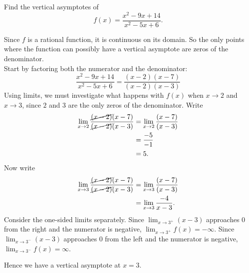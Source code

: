 \documentclass{ximera}
\begin{document}
\begin{example}
Find the vertical asymptotes of 
\[
f(x) = \frac{x^2-9x+14}{x^2-5x+6}.
\]

\begin{explanation}
Since $f$ is a rational function, it is continuous on its domain. So the only points where the function can possibly have a vertical asymptote are zeros of the denominator. \\
Start by factoring both the numerator and the denominator:
\[
\frac{x^2-9x+14}{x^2-5x+6} = \frac{(x-2)(x-7)}{(x-2)(x-3)}
\]
Using limits, we must investigate what happens with $ f(x)$ when $x\to 2$ and $x\to 3$, since $2$ and $3$ are the only zeros of the denominator. Write
\begin{align*}
\lim_{x\to 2} \frac{\cancel{(x-2)}(x-7)}{\cancel{(x-2)}(x-3)} &= \lim_{x\to 2} \frac{(x-7)}{(x-3)}\\
&= \frac{-5}{-1}\\
&=5.
\end{align*}
Now write
\begin{align*}
\lim_{x\to 3} \frac{\cancel{(x-2)}(x-7)}{\cancel{(x-2)}(x-3)} &= \lim_{x\to 3} \frac{(x-7)}{(x-3)}\\
&= \lim_{x\to 3}\frac{-4}{x-3}.
\end{align*}
Consider the one-sided limits separately.  Since $\lim_{x\to 3^+}
(x-3)$ approaches $0$ from the right and the numerator is negative,
$\lim_{x\to 3^+} f(x) = -\infty$. Since $\lim_{x\to 3^-} (x-3)$
approaches $0$ from the left and the numerator is negative,
$\lim_{x\to 3^-} f(x) = \infty$.
\begin{image}
\end{image}
Hence we have a vertical asymptote at $x=3$.
\end{explanation}
\end{example}
\end{document}
